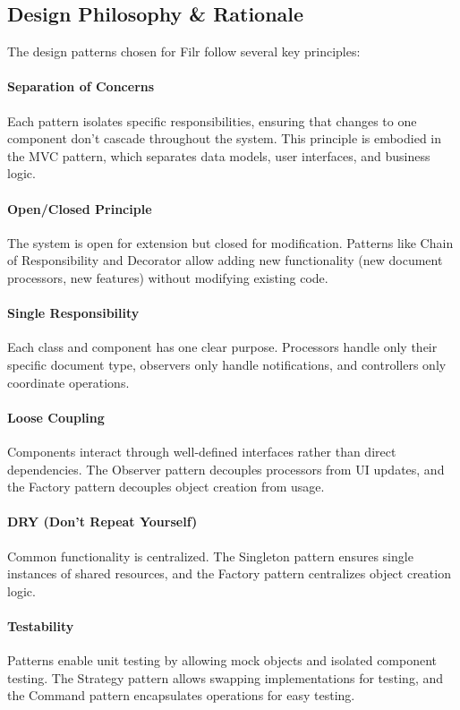 \documentclass[11pt, a4paper]{article}
\theoremstyle{plain}
\theoremstyle{definition}
\begin{document}
\subsection{Design Philosophy \& Rationale}

The design patterns chosen for Filr follow several key principles:

\paragraph{Separation of Concerns}
Each pattern isolates specific responsibilities, ensuring that changes to one component don't cascade throughout the system. This principle is embodied in the MVC pattern, which separates data models, user interfaces, and business logic.

\paragraph{Open/Closed Principle}
The system is open for extension but closed for modification. Patterns like Chain of Responsibility and Decorator allow adding new functionality (new document processors, new features) without modifying existing code.

\paragraph{Single Responsibility}
Each class and component has one clear purpose. Processors handle only their specific document type, observers only handle notifications, and controllers only coordinate operations.

\paragraph{Loose Coupling}
Components interact through well-defined interfaces rather than direct dependencies. The Observer pattern decouples processors from UI updates, and the Factory pattern decouples object creation from usage.

\paragraph{DRY (Don't Repeat Yourself)}
Common functionality is centralized. The Singleton pattern ensures single instances of shared resources, and the Factory pattern centralizes object creation logic.

\paragraph{Testability}
Patterns enable unit testing by allowing mock objects and isolated component testing. The Strategy pattern allows swapping implementations for testing, and the Command pattern encapsulates operations for easy testing.
\end{document}
